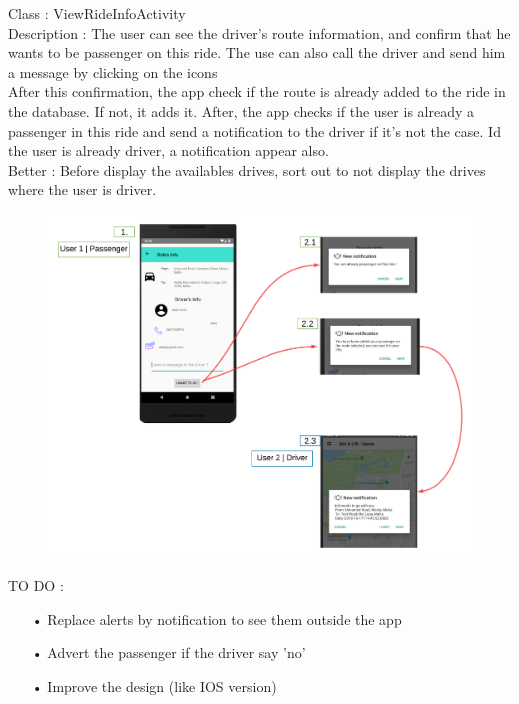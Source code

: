 Class : ViewRideInfoActivity\\
Description : The user can see the driver’s route information, and confirm that he wants to be passenger on this ride.  The use can also call the driver and send him a message by clicking on the icons\\
After this confirmation, the app check if the route is already added to the ride in the database. If not, it adds it. After, the app checks if the user is already a passenger in this ride and send a notification to the driver if it’s not the case.
\newline
Id the user is already driver, a notification appear also.\\
Better : Before display the availables drives, sort out to not display the drives where the user is driver. 
\begin{figure}[H]
\begin{center}
\includegraphics[scale = 0.3]{diagrams/maquette_notif_pass-dri.png} 
\end{center}
\end{figure}

TO DO :
\begin{enumerate}
\item[•] Replace alerts by notification to see them outside the app
\item[•] Advert the passenger if the driver say 'no'
\item[•] Improve the design (like IOS version)
\end{enumerate}

